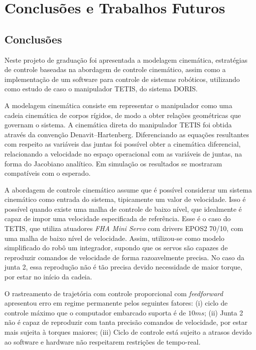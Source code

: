 \chapter{Conclusões e Trabalhos Futuros}

\section{Conclusões}

Neste projeto de graduação foi apresentada a modelagem cinemática, estratégias de controle baseadas na abordagem de controle cinemático, assim como a implementação de um software para controle de sistemas robóticos, utilizando como estudo de caso o manipulador TETIS, do sistema DORIS. 

A modelagem cinemática consiste em representar o manipulador como uma cadeia cinemática de corpos rígidos, de modo a obter relações geométricas que governam o sistema. A cinemática direta do manipulador TETIS foi obtida através da convenção Denavit–Hartenberg. Diferenciando as equações resultantes com respeito as variáveis das juntas foi possível obter a cinemática diferencial, relacionando a velocidade no espaço operacional com as variáveis de juntas, na forma do Jacobiano analítico. Em simulação os resultados se mostraram compatíveis com o esperado. 

A abordagem de controle cinemático assume que é possível considerar um sistema cinemático como entrada do sistema, tipicamente um valor de velocidade. Isso é possível quando existe uma malha de controle de baixo nível, que idealmente é capaz de impor uma velocidade especificada de referência. Esse é o caso do TETIS, que utiliza atuadores \textit{FHA Mini Servo} com drivers EPOS2 70/10, com uma malha de baixo nível de velocidade. Assim, utilizou-se como modelo simplificado do robô um integrador, supondo que os servos são capazes de reproduzir comandos de velocidade de forma razoavelmente precisa. No caso da junta 2, essa reprodução não é tão precisa devido necessidade de maior torque, por estar no início da cadeia.

O rastreamento de trajetória com controle proporcional com \textit{feedforward} apresentou erro em regime permanente pelos seguintes fatores: (i) ciclo de controle máximo que o computador embarcado suporta é de $10ms$; (ii) Junta 2 não é capaz de reproduzir com tanta precisão comandos de velocidade, por estar mais sujeita à torques maiores; (iii) Ciclo de controle está sujeito a atrasos devido ao software e hardware não respeitarem restrições de tempo-real. 

